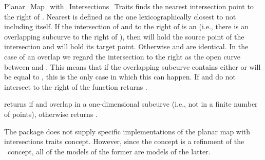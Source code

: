 \begin{ccRefConcept}{Planar_Map_with_Intersections_Traits}
{finds the
nearest intersection point to the right of . Nearest is defined as the
one lexicographically closest to  not including  itself.
If the intersection of  and  to the
right of  is an  (i.e., there is an overlapping subcurve
to the right of ),
then  will hold the source point of the intersection and
 will hold its target point. Otherwise  and  are
identical. In the case of an overlap we regard the intersection
to the right as the open curve between  and . This means that
if the overlapping subcurve contains  either  or  will
be equal to , this is the only case in which this can happen.
If  and  do not intersect to the right of 
the function returns .
}


{returns  if  and  overlap
in a one-dimensional subcurve (i.e., not in a finite number
of points), otherwise returns
.}

\ccHasModels
  The package does not supply specific implementations of the planar
  map with intersections traits concept. However, since the
   concept is a refinment of the \ccRefName\
  concept, all of the models of the former are models of the latter.

  \\
  \\
  \\

\end{ccRefConcept}

\ccRefPageEnd
